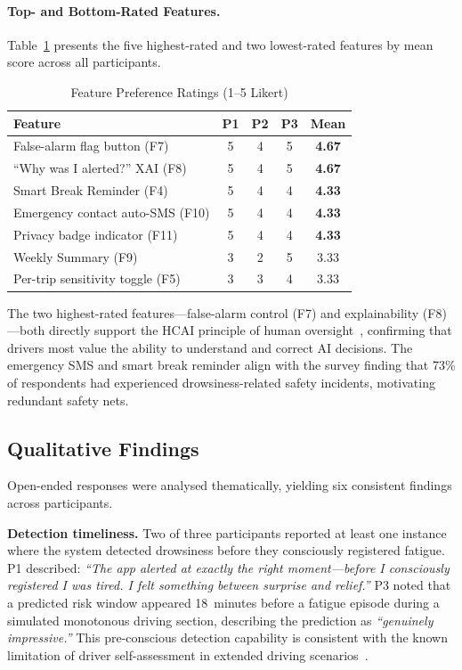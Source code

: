 \documentclass[sigconf]{acmart}
\begin{document}
\paragraph{Top- and Bottom-Rated Features.}
Table~\ref{tab:feature_ratings} presents the five highest-rated and two lowest-rated features by mean score across all participants.

\begin{table}[H]
\centering
\caption{Feature Preference Ratings (1--5 Likert)}
\label{tab:feature_ratings}
\small
\begin{tabular}{p{4.2cm}cccc}
\toprule
\textbf{Feature} & \textbf{P1} & \textbf{P2} & \textbf{P3} & \textbf{Mean} \\
\midrule
False-alarm flag button (F7) & 5 & 4 & 5 & \textbf{4.67} \\
``Why was I alerted?'' XAI (F8) & 5 & 4 & 5 & \textbf{4.67} \\
Smart Break Reminder (F4) & 5 & 4 & 4 & \textbf{4.33} \\
Emergency contact auto-SMS (F10) & 5 & 4 & 4 & \textbf{4.33} \\
Privacy badge indicator (F11) & 5 & 4 & 4 & \textbf{4.33} \\
\midrule
Weekly Summary (F9) & 3 & 2 & 5 & 3.33 \\
Per-trip sensitivity toggle (F5) & 3 & 3 & 4 & 3.33 \\
\bottomrule
\end{tabular}
\end{table}

The two highest-rated features---false-alarm control (F7) and explainability (F8)---both directly support the HCAI principle of human oversight~\cite{ref14, ref23}, confirming that drivers most value the ability to understand and correct AI decisions. The emergency SMS and smart break reminder align with the survey finding that 73\% of respondents had experienced drowsiness-related safety incidents, motivating redundant safety nets.

\subsection{Qualitative Findings}

Open-ended responses were analysed thematically, yielding six consistent findings across participants.

\textbf{Detection timeliness.} Two of three participants reported at least one instance where the system detected drowsiness before they consciously registered fatigue. P1 described: \textit{``The app alerted at exactly the right moment---before I consciously registered I was tired. I felt something between surprise and relief.''} P3 noted that a predicted risk window appeared 18~minutes before a fatigue episode during a simulated monotonous driving section, describing the prediction as \textit{``genuinely impressive.''} This pre-conscious detection capability is consistent with the known limitation of driver self-assessment in extended driving scenarios~\cite{ref18}.
\end{document}
